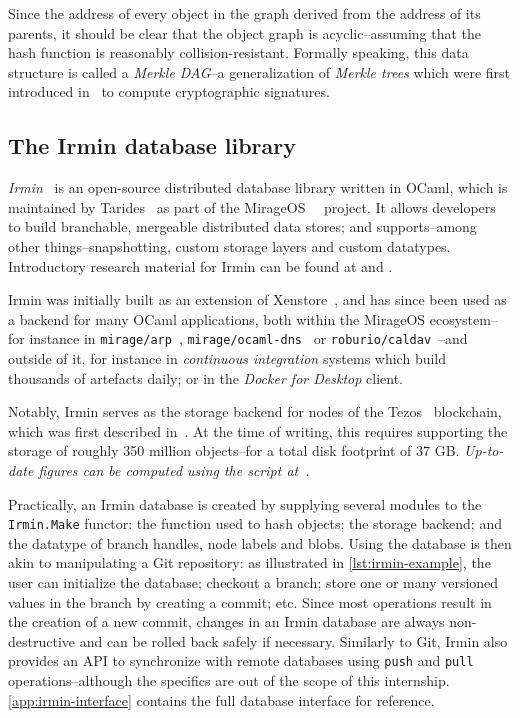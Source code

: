 \bigskip
Since the address of every object in the graph derived from the address of its parents, it should be clear that the object graph is acyclic--assuming that the hash function is reasonably collision-resistant. Formally speaking, this data structure is called a \emph{Merkle DAG}--a generalization of \emph{Merkle trees} which were first introduced in~\cite{merkle88} to compute cryptographic signatures.

\subsection{The Irmin database library}

\emph{Irmin}~\cite{irmin} is an open-source distributed
database library written in OCaml, which is maintained by Tarides~\cite{tarides} as part of the MirageOS~\cite{mirage}~\cite{mirage-paper} project. It allows developers to build branchable, mergeable distributed data stores; and supports--among other things--snapshotting, custom storage layers and custom datatypes. Introductory research material for Irmin can be found at \cite{irmin15} and \cite{irmin19}.

Irmin was initially built as an extension of Xenstore~\cite{xenstore}, and has since been used as a backend for many OCaml applications, both within the MirageOS ecosystem--for instance in \texttt{mirage/arp}~\cite{mirage-arp}, \texttt{mirage/ocaml-dns}~\cite{mirage-dns} or \texttt{roburio/caldav}~\cite{roburio-caldav}--and outside of it, for instance in \emph{continuous integration} systems which build thousands of artefacts daily; or in the \emph{Docker for Desktop} client.

Notably, Irmin serves as the storage backend for nodes of the Tezos~\cite{tezos} blockchain, which was first described in~\cite{tezos14}. At the time of writing, this requires supporting the storage of roughly 350 million objects--for a total disk footprint of 37 GB. \emph{Up-to-date figures can be computed using the script at~\cite{tree-statistics}.}

Practically, an Irmin database is created by supplying several modules to the \texttt{Irmin.Make} functor: the function used to hash objects; the storage backend; and the datatype of branch handles, node labels and blobs. Using the database is then akin to manipulating a Git repository: as illustrated in \cref{lst:irmin-example}, the user can initialize the database; checkout a branch; store one or many versioned values in the branch by creating a commit; etc. Since most operations result in the creation of a new commit, changes in an Irmin database are always non-destructive and can be rolled back safely if necessary. Similarly to Git, Irmin also provides an API to synchronize with remote databases using \texttt{push} and \texttt{pull} operations--although the specifics are out of the scope of this internship. \cref{app:irmin-interface} contains the full database interface for reference.

